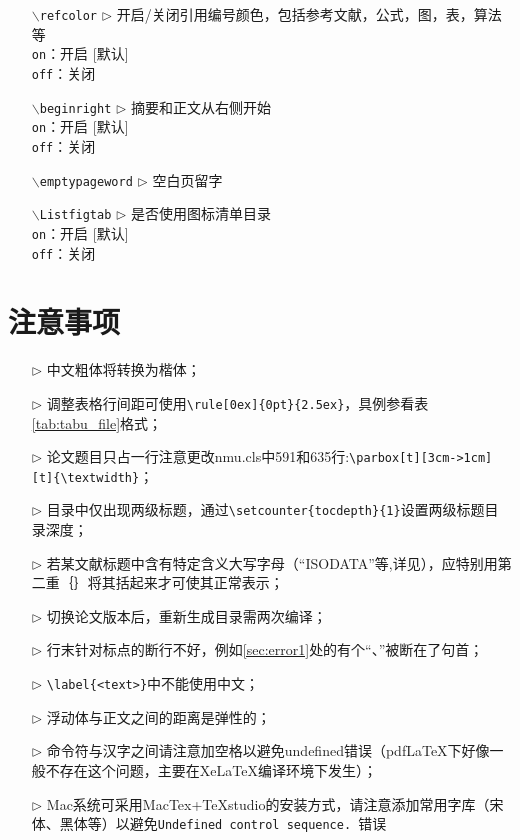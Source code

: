 \begin{itemize}[leftmargin=3cm]
	\item[{\tt  $\backslash$refcolor} $\triangleright$]  开启/关闭引用编号颜色，包括参考文献，公式，图，表，算法等\\
	\texttt{on}：开启 [默认]\\
	\texttt{off}：关闭
	\item[{\tt $\backslash$beginright} $\triangleright$]  摘要和正文从右侧开始\\
	\texttt{on}：开启 [默认]\\
	\texttt{off}：关闭
	\item[{\tt $\backslash$emptypageword} $\triangleright$]  空白页留字
	\item[{\tt $\backslash$Listfigtab} $\triangleright$]  是否使用图标清单目录\\
	\texttt{on}：开启 [默认]\\
	\texttt{off}：关闭
\end{itemize}


\section{注意事项}
\begin{itemize}
  \item[$\triangleright$] 中文粗体将转换为楷体；
  \item[$\triangleright$] 调整表格行间距可使用\verb|\rule[0ex]{0pt}{2.5ex}|，具例参看表\ref{tab:tabu_file}格式；
  \item[$\triangleright$] 论文题目只占一行注意更改nmu.cls中591和635行:\verb|\parbox[t][3cm->1cm][t]{\textwidth}|；
  \item[$\triangleright$] 目录中仅出现两级标题，通过\verb|\setcounter{tocdepth}{1}|设置两级标题目录深度；
  \item[$\triangleright$] 若某文献标题中含有特定含义大写字母（“ISODATA”等,详见\cite{Li2017An}），应特别用第二重｛｝将其括起来才可使其正常表示；
  \item[$\triangleright$] 切换论文版本后，重新生成目录需两次编译；
  \item[$\triangleright$] 行末针对标点的断行不好，例如\ref{sec:error1}处的有个“、”被断在了句首；
  \item[$\triangleright$] \verb|\label{<text>}|中不能使用中文；
  \item[$\triangleright$] 浮动体与正文之间的距离是弹性的；
  \item[$\triangleright$] 命令符与汉字之间请注意加空格以避免undefined错误（pdfLaTeX下好像一般不存在这个问题，主要在XeLaTeX编译环境下发生）；
  \item[$\triangleright$] Mac系统可采用MacTex+TeXstudio的安装方式，请注意添加常用字库（宋体、黑体等）以避免\verb|Undefined control sequence. |错误
\end{itemize}

